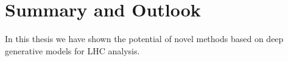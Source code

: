 %
%
%

\chapter{Summary and Outlook}\label{chap:summ}
\enlargethispage{2ex}
\vspace*{-2pt}

In this thesis we have shown the potential of novel methods based on deep generative models for LHC analysis. 


